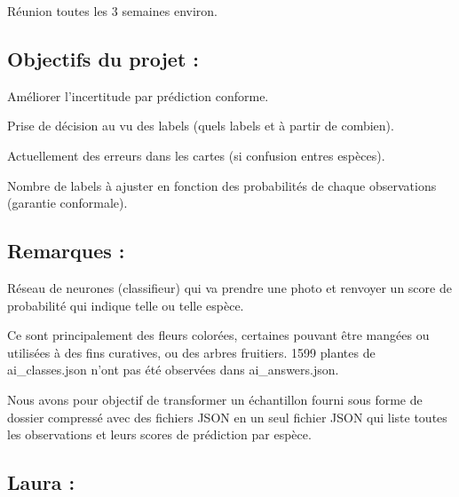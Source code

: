 \documentclass[french]{article}
\begin{document}
Réunion toutes les $3$ semaines environ. 

\subsection{Objectifs du projet :}

Améliorer l'incertitude par prédiction conforme.

Prise de décision au vu des labels (quels labels et à partir de combien).

Actuellement des erreurs dans les cartes (si confusion entres espèces).
  
Nombre de labels à ajuster en fonction des probabilités de chaque observations (garantie conformale).

\subsection{Remarques :}

Réseau de neurones (classifieur) qui va prendre une photo et renvoyer un score de probabilité qui indique telle ou telle espèce.

\vspace{0.2cm}

Ce sont principalement des fleurs colorées, certaines pouvant être mangées ou utilisées à des fins curatives, ou des arbres fruitiers.
1599 plantes de ai\_classes.json n'ont pas été observées dans ai\_answers.json.

\vspace{0.2cm}

Nous avons pour objectif de transformer un échantillon fourni sous forme de dossier compressé avec des fichiers JSON en un seul fichier JSON qui liste toutes les observations et leurs scores de prédiction par espèce. 

\subsection{Laura :}
\end{document}
